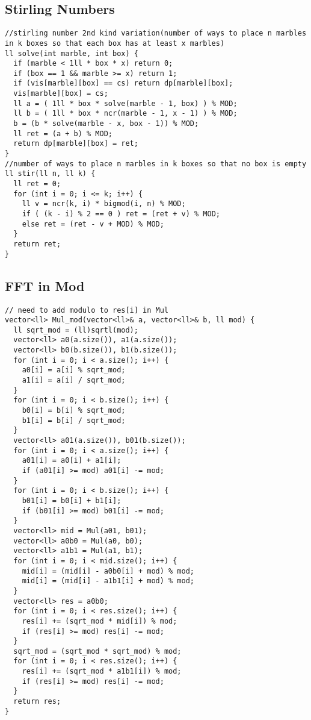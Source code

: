 \documentclass[10pt,a4paper,onesided]{article}
\begin{document}
\begin{multicols*}{3}
\subsection{Stirling Numbers}
\begin{lstlisting}
//stirling number 2nd kind variation(number of ways to place n marbles in k boxes so that each box has at least x marbles)
ll solve(int marble, int box) {
  if (marble < 1ll * box * x) return 0;
  if (box == 1 && marble >= x) return 1;
  if (vis[marble][box] == cs) return dp[marble][box];
  vis[marble][box] = cs;
  ll a = ( 1ll * box * solve(marble - 1, box) ) % MOD;
  ll b = ( 1ll * box * ncr(marble - 1, x - 1) ) % MOD;
  b = (b * solve(marble - x, box - 1)) % MOD;
  ll ret = (a + b) % MOD;
  return dp[marble][box] = ret;
}
//number of ways to place n marbles in k boxes so that no box is empty
ll stir(ll n, ll k) {
  ll ret = 0;
  for (int i = 0; i <= k; i++) {
    ll v = ncr(k, i) * bigmod(i, n) % MOD;
    if ( (k - i) % 2 == 0 ) ret = (ret + v) % MOD;
    else ret = (ret - v + MOD) % MOD;
  }
  return ret;
}
\end{lstlisting}
\subsection{FFT in Mod}
\begin{lstlisting}
// need to add modulo to res[i] in Mul
vector<ll> Mul_mod(vector<ll>& a, vector<ll>& b, ll mod) {
  ll sqrt_mod = (ll)sqrtl(mod);
  vector<ll> a0(a.size()), a1(a.size());
  vector<ll> b0(b.size()), b1(b.size());
  for (int i = 0; i < a.size(); i++) {
    a0[i] = a[i] % sqrt_mod;
    a1[i] = a[i] / sqrt_mod;
  }
  for (int i = 0; i < b.size(); i++) {
    b0[i] = b[i] % sqrt_mod;
    b1[i] = b[i] / sqrt_mod;
  }
  vector<ll> a01(a.size()), b01(b.size());
  for (int i = 0; i < a.size(); i++) {
    a01[i] = a0[i] + a1[i];
    if (a01[i] >= mod) a01[i] -= mod;
  }
  for (int i = 0; i < b.size(); i++) {
    b01[i] = b0[i] + b1[i];
    if (b01[i] >= mod) b01[i] -= mod;
  }
  vector<ll> mid = Mul(a01, b01);
  vector<ll> a0b0 = Mul(a0, b0);
  vector<ll> a1b1 = Mul(a1, b1);
  for (int i = 0; i < mid.size(); i++) {
    mid[i] = (mid[i] - a0b0[i] + mod) % mod;
    mid[i] = (mid[i] - a1b1[i] + mod) % mod;
  }
  vector<ll> res = a0b0;
  for (int i = 0; i < res.size(); i++) {
    res[i] += (sqrt_mod * mid[i]) % mod;
    if (res[i] >= mod) res[i] -= mod;
  }
  sqrt_mod = (sqrt_mod * sqrt_mod) % mod;
  for (int i = 0; i < res.size(); i++) {
    res[i] += (sqrt_mod * a1b1[i]) % mod;
    if (res[i] >= mod) res[i] -= mod;
  }
  return res;
} 
\end{lstlisting}

\end{multicols*}
\end{document}

